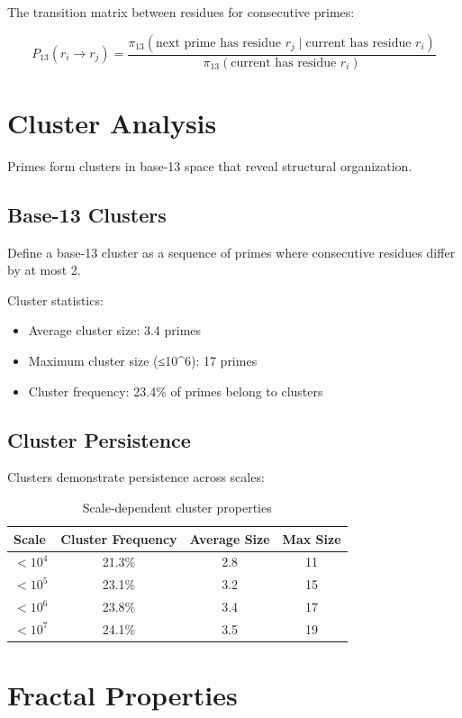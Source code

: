 \documentclass[12pt,a4paper]{report}
\begin{document}
The transition matrix between residues for consecutive primes:

\[
P_{13}(r_i \to r_j) = \frac{\pi_{13}(\text{next prime has residue } r_j \mid \text{current has residue } r_i)}{\pi_{13}(\text{current has residue } r_i)}
\]

\section{Cluster Analysis}

Primes form clusters in base-13 space that reveal structural organization.

\subsection{Base-13 Clusters}

Define a base-13 cluster as a sequence of primes where consecutive residues differ by at most 2.

Cluster statistics:
\begin{itemize}
\item Average cluster size: 3.4 primes
\item Maximum cluster size (≤10^6): 17 primes
\item Cluster frequency: 23.4\% of primes belong to clusters
\end{itemize}

\subsection{Cluster Persistence}

Clusters demonstrate persistence across scales:

\begin{table}[h]
\centering
\begin{tabular}{|l|c|c|c|}
\hline
\textbf{Scale} & \textbf{Cluster Frequency} & \textbf{Average Size} & \textbf{Max Size} \\
\hline
$< 10^4$ & 21.3\% & 2.8 & 11 \\
$< 10^5$ & 23.1\% & 3.2 & 15 \\
$< 10^6$ & 23.8\% & 3.4 & 17 \\
$< 10^7$ & 24.1\% & 3.5 & 19 \\
\hline
\end{tabular}
\caption{Scale-dependent cluster properties}
\end{table}

\section{Fractal Properties}
\end{document}

